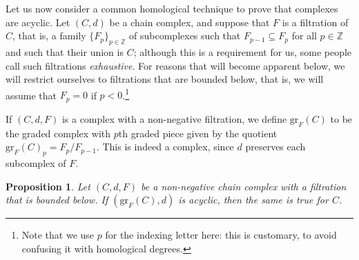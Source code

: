 \documentclass[fleqn, a4paper, twoside]{article}
\newcommand{\0}{\langle 0\rangle}
\newcommand{\XX}{\mathcal{X}}
\newcommand{\RR}{\mathcal{R}}
\newcommand{\B}[1]{\mathsf{B}(#1)}
\newcommand{\f}{\mathsf{f}}
\DeclareRobustCommand{\[}{\begin{equation}}%
\DeclareRobustCommand{\]}{\end{equation}}%
\theoremstyle{mytheorem}
\newtheorem{proposition}[theorem]{Proposition}
\theoremstyle{introthm}
\theoremstyle{mydefinition}
\theoremstyle{mydefinition2}
\theoremstyle{plain} %
\newcommand{\?}{\,?\,}
\newcommand{\PP}{{\mathcal{P}}}
\theoremstyle{mytheorem}
\theoremstyle{plain} %
\begin{document}
%
%

Let us now consider a common homological technique to 
prove that complexes are acyclic. Let $(C,d)$ be
a chain complex, and suppose that $F$ is a filtration
of $C$, that is, a family 
$\{ F_p \}_{p\in\mathbb Z}$ of subcomplexes
such that $F_{p-1}\subseteq F_p$ for all
 $p\in \mathbb Z$ and such that their union is
 $C$; although this is a requirement for us, some
 people call such filtrations \emph{exhaustive}. For 
 reasons that will become apparent below,
 we will restrict ourselves to filtrations that are
 bounded below, that is, we will assume that $F_p=0$
 if $p<0$.\footnote{Note that we use $p$ for the
 indexing letter here: this is customary, to avoid
 confusing it with homological degrees.}
 
 If $(C,d,F)$ is a complex with a non-negative
 filtration, we define $\mathrm{gr}_F(C)$ to be
 the graded complex with $p$th graded piece given by
 the quotient $\mathrm{gr}_F(C)_p =   F_p/F_{p-1}$.
 This is indeed a complex, since $d$ preserves 
 each subcomplex of $F$.
 
 \begin{proposition}\label{prop:graded}
 Let $(C,d,F)$ be a non-negative chain
 complex with a filtration that is
 bounded below. If $(\mathrm{gr}_F(C),d)$ is
 acyclic, then the same is true for $C$.
\end{proposition}  
  
\end{document}
